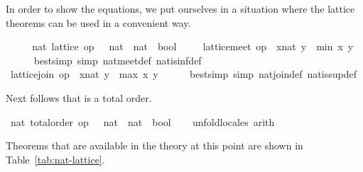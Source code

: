 \begin{isabellebody}
\begin{isamarkuptxt}%
In order to show the equations, we put ourselves in a
    situation where the lattice theorems can be used in a convenient way.%
\end{isamarkuptxt}%
\isamarkuptrue%
\ \ \isamarkupfalse%
\ \isamarkupfalse%
\ nat{\isacharcolon}\ lattice\ {\isachardoublequoteopen}op\ {\isasymle}\ {\isacharcolon}{\isacharcolon}\ nat\ {\isasymRightarrow}\ nat\ {\isasymRightarrow}\ bool{\isachardoublequoteclose}\ \isacommand{{\isachardot}}\isamarkupfalse%
\isanewline
\ \ \isamarkupfalse%
\ {\isachardoublequoteopen}lattice{\isachardot}meet\ op\ {\isasymle}\ {\isacharparenleft}x{\isacharcolon}{\isacharcolon}nat{\isacharparenright}\ y\ {\isacharequal}\ min\ x\ y{\isachardoublequoteclose}\isanewline
\ \ \ \ \isamarkupfalse%
\ {\isacharparenleft}bestsimp\ simp{\isacharcolon}\ nat{\isachardot}meet{\isacharunderscore}def\ nat{\isachardot}is{\isacharunderscore}inf{\isacharunderscore}def{\isacharparenright}\isanewline
\ \ \isamarkupfalse%
\ {\isachardoublequoteopen}lattice{\isachardot}join\ op\ {\isasymle}\ {\isacharparenleft}x{\isacharcolon}{\isacharcolon}nat{\isacharparenright}\ y\ {\isacharequal}\ max\ x\ y{\isachardoublequoteclose}\isanewline
\ \ \ \ \isamarkupfalse%
\ {\isacharparenleft}bestsimp\ simp{\isacharcolon}\ nat{\isachardot}join{\isacharunderscore}def\ nat{\isachardot}is{\isacharunderscore}sup{\isacharunderscore}def{\isacharparenright}\isanewline
{}\isamarkupfalse%
%
\endisatagvisible
{\isafoldvisible}%
%
\isadelimvisible
%
\endisadelimvisible
%
\begin{isamarkuptext}%
Next follows that \isa{{\isasymle}} is a total order.%
\end{isamarkuptext}%
\isamarkuptrue%
%
\isadelimvisible
%
\endisadelimvisible
%
\isatagvisible
{}\isamarkupfalse%
\ nat{\isacharcolon}\ total{\isacharunderscore}order\ {\isachardoublequoteopen}op\ {\isasymle}\ {\isacharcolon}{\isacharcolon}\ nat\ {\isasymRightarrow}\ nat\ {\isasymRightarrow}\ bool{\isachardoublequoteclose}\isanewline
\ \ \isamarkupfalse%
\ unfold{\isacharunderscore}locales\ arith%
\endisatagvisible
{\isafoldvisible}%
%
\isadelimvisible
%
\endisadelimvisible
%
\begin{isamarkuptext}%
Theorems that are available in the theory at this point are shown in
  Table~\ref{tab:nat-lattice}.


\end{isamarkuptext}
\end{isabellebody}
